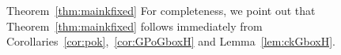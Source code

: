 %
\begin{proofof}{Theorem~\ref{thm:mainkfixed}}
For completeness, we point out that Theorem~\ref{thm:mainkfixed} follows immediately from 
Corollaries~\ref{cor:pok},~\ref{cor:GPoGboxH} and Lemma~\ref{lem:ckGboxH}.
\end{proofof}




